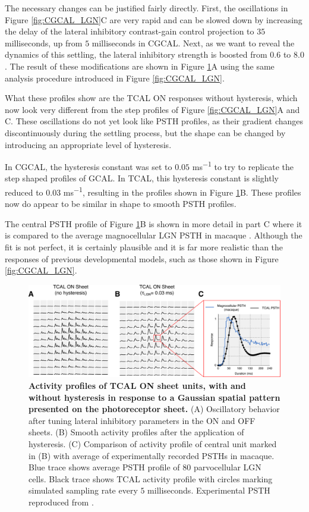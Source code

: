 \documentclass[phd,ianc,twoside]{infthesis}
\begin{document}
The necessary changes can be justified fairly directly. First, the
oscillations in Figure \ref{fig:CGCAL_LGN}C are very rapid and can be
slowed down by increasing the delay of the lateral inhibitory
contrast-gain control projection to $35$ milliseconds, up from $5$
milliseconds in CGCAL. Next, as we want to reveal the dynamics of this
settling, the lateral inhibitory strength is boosted from $0.6$ to
$8.0$. The result of these modifications are shown in Figure
\ref{fig:TCAL_LGN_PSTH}A using the same analysis procedure introduced in
Figure \ref{fig:CGCAL_LGN}.

What these profiles show are the TCAL ON responses without hysteresis,
which now look very different from the step profiles of Figure
\ref{fig:CGCAL_LGN}A and C. These oscillations do not yet look like PSTH
profiles, as their gradient changes discontinuously during the settling
process, but the shape can be changed by introducing an appropriate level of
hysteresis.

In CGCAL, the hysteresis constant was set to $0.05$ \si{ms^{-1}} to try
to replicate the step shaped profiles of GCAL. In TCAL, this hysteresis
constant is slightly reduced to $0.03$ \si{ms^{-1}}, resulting in the
profiles shown in Figure \ref{fig:TCAL_LGN_PSTH}B. These profiles now do
appear to be similar in shape to smooth PSTH profiles.

The central PSTH profile of Figure \ref{fig:TCAL_LGN_PSTH}B is shown in
more detail in part C where it is compared to the average magnocellular
LGN PSTH in macaque \citep{maunsell_visneuro99}. Although the fit is not
perfect, it is certainly plausible and it is far more realistic than the
responses of previous developmental models, such as those shown in
Figure \ref{fig:CGCAL_LGN}.

\begin{figure}
\center
\includegraphics[width=1\textwidth]{./figures/TCAL_LGN_PSTH.pdf}
\caption{{\bf Activity profiles of TCAL ON sheet units, with and without
    hysteresis in response to a Gaussian spatial pattern presented on
    the photoreceptor sheet.} (A) Oscillatory behavior after tuning
  lateral inhibitory parameters in the ON and OFF sheets. (B) Smooth
  activity profiles after the application of hysteresis. (C) Comparison
  of activity profile of central unit marked in (B) with average of
  experimentally recorded PSTHs in macaque.  Blue trace shows average
  PSTH profile of 80 parvocellular LGN cells. Black trace shows TCAL
  activity profile with circles marking simulated sampling rate every
  $5$ milliseconds. Experimental PSTH reproduced from
  \citet{maunsell_visneuro99}.}
\label{fig:TCAL_LGN_PSTH}
\end{figure}
\end{document}
